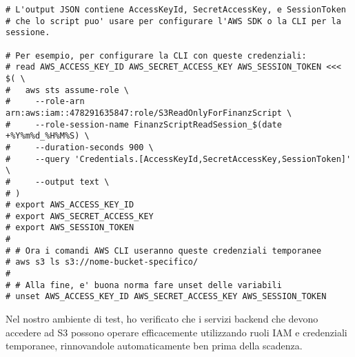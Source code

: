 \begin{itemize}
\begin{lstlisting}[style=bash, caption={Ottenere credenziali temporanee tramite STS AssumeRole per uno script}, label=lst:sts-assume-role-iam]
# L'output JSON contiene AccessKeyId, SecretAccessKey, e SessionToken
# che lo script puo' usare per configurare l'AWS SDK o la CLI per la sessione.

# Per esempio, per configurare la CLI con queste credenziali:
# read AWS_ACCESS_KEY_ID AWS_SECRET_ACCESS_KEY AWS_SESSION_TOKEN <<< $( \
#   aws sts assume-role \
#     --role-arn arn:aws:iam::478291635847:role/S3ReadOnlyForFinanzScript \
#     --role-session-name FinanzScriptReadSession_$(date +%Y%m%d_%H%M%S) \
#     --duration-seconds 900 \
#     --query 'Credentials.[AccessKeyId,SecretAccessKey,SessionToken]' \
#     --output text \
# )
# export AWS_ACCESS_KEY_ID
# export AWS_SECRET_ACCESS_KEY
# export AWS_SESSION_TOKEN
#
# # Ora i comandi AWS CLI useranno queste credenziali temporanee
# aws s3 ls s3://nome-bucket-specifico/
#
# # Alla fine, e' buona norma fare unset delle variabili
# unset AWS_ACCESS_KEY_ID AWS_SECRET_ACCESS_KEY AWS_SESSION_TOKEN
    \end{lstlisting}
    Nel nostro ambiente di test, ho verificato che i servizi backend che devono accedere ad S3 possono operare efficacemente utilizzando ruoli IAM e credenziali temporanee, rinnovandole automaticamente ben prima della scadenza.
\end{itemize}

